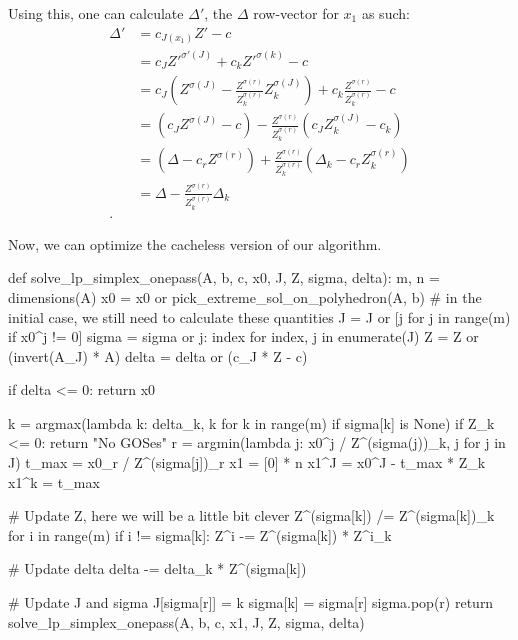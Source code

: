 Using this, one can calculate \( \Delta' \), the \( \Delta \) row-vector for \(
x_{1}\) as such:
\begin{align*}
  \Delta' &= c_{J(x_{1})}Z' - c \\
  &= c_{J}Z'^{\sigma'(J)} + c_{k}Z'^{\sigma(k)} - c \\
  &= c_{J}\left( Z^{\sigma(J)} - \frac{Z^{\sigma(r)}}{Z^{\sigma(r)}_{k}}
  Z^{\sigma(J)}_{k} \right) + c_{k} \frac{Z^{\sigma(r)}}{Z^{\sigma(r)}_{k}} - c \\
  &= (c_{J}Z^{\sigma(J)} - c) - \frac{Z^{\sigma(r)}}{Z^{\sigma(r)}_{k}}\left(
  c_{J}Z^{\sigma(J)}_{k} - c_{k} \right)  \\
  &= \left( \Delta - c_{r}Z^{\sigma(r)} \right) +
  \frac{Z^{\sigma(r)}}{Z^{\sigma(r)}_{k}}\left( \Delta_{k} -
  c_{r}Z^{\sigma(r)}_{k} \right)  \\
  &= \Delta - \frac{Z^{\sigma(r)}}{Z^{\sigma(r)}_{k}}\Delta_{k} \\
.\end{align*}

Now, we can optimize the cacheless version of our algorithm.

\begin{python}
def solve_lp_simplex_onepass(A, b, c, x0, J, Z, sigma, delta):
  m, n = dimensions(A)
  x0 = x0 or pick_extreme_sol_on_polyhedron(A, b)
  # in the initial case, we still need to calculate these quantities
  J = J or [j for j in range(m) if x0^j != 0]
  sigma = sigma or {j: index for index, j in enumerate(J)}
  Z = Z or (invert(A_J) * A)
  delta = delta or (c_J * Z - c)

  if delta <= 0:
    return x0

  k = argmax(lambda k: delta_k,
             k for k in range(m) if sigma[k] is None)
  if Z_k <= 0:
    return "No GOSes"
  r = argmin(lambda j: x0^j / Z^(sigma(j))_k,
             j for j in J)
  t_max = x0_r / Z^(sigma[j])_r
  x1 = [0] * n
  x1^J = x0^J - t_max * Z_k
  x1^k = t_max

  # Update Z, here we will be a little bit clever
  Z^(sigma[k]) /= Z^(sigma[k])_k
  for i in range(m) if i != sigma[k]:
    Z^i -= Z^(sigma[k]) * Z^i_k

  # Update delta
  delta -= delta_k * Z^(sigma[k])

  # Update J and sigma
  J[sigma[r]] = k
  sigma[k] = sigma[r]
  sigma.pop(r)
  return solve_lp_simplex_onepass(A, b, c, x1, J, Z, sigma, delta)
\end{python}


